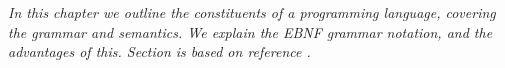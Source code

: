 \textit{In this chapter we outline the constituents of a programming language, covering the grammar and semantics. We explain the EBNF grammar notation, and the advantages of this. Section \label{sec:ebnf} is based on reference \cite{misc:spo}.}